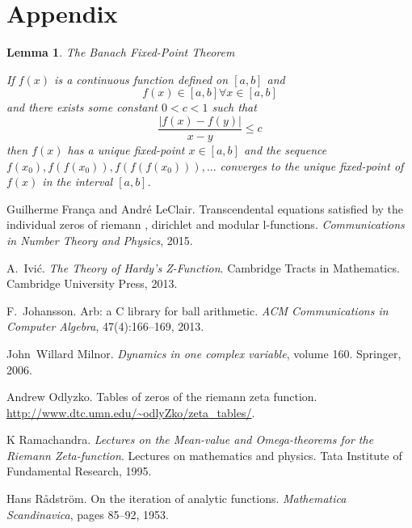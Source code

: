 \documentclass{elsarticle}
\newcommand{\tmtextit}[1]{{\itshape{#1}}}
\newtheorem{lemma}{Lemma}
{\theorembodyfont{\rmfamily}\newtheorem{note}{Note}}
\begin{document}
\section{Appendix}

\begin{lemma}
  The Banach Fixed-Point Theorem
  
  If $f (x)$ is a continuous function defined on $[a, b]$ and
  \begin{equation}
    f (x) \in [a, b] \forall x \in [a, b]
  \end{equation}
  and there exists some constant $0 < c < 1$ such that
  \begin{equation}
    \text{$\frac{| f (x) - f (y) |}{x - y} \leqslant c$} \label{lc}
  \end{equation}
  then $f (x)$ has a unique fixed-point $x \in [a, b]$ and the sequence $f
  (x_0), f (f (x_0)), f (f (f (x_0))), \ldots$ converges to the unique
  fixed-point of $f (x)$ in the interval $[a, b]$.
\end{lemma}

\begin{thebibliography}{1}
  Guilherme Fran{\c c}a  and  Andr{\'e} LeClair.{\newblock}
  Transcendental equations satisfied by the individual zeros of riemann
  {\zeta}, dirichlet and modular l-functions.{\newblock}
  \tmtextit{Communications in Number Theory and Physics}, 2015.{\newblock}
  
  A.~Ivi{\'c}.{\newblock} \tmtextit{The Theory of Hardy's
  Z-Function}.{\newblock} Cambridge Tracts in Mathematics. Cambridge
  University Press, 2013.{\newblock}
  
  F.~Johansson.{\newblock} Arb: a C library for
  ball arithmetic.{\newblock} \tmtextit{ACM Communications in Computer
  Algebra}, 47(4):166--169, 2013.{\newblock}
  
  John~Willard Milnor.{\newblock}
  \tmtextit{Dynamics in one complex variable},  volume  160.{\newblock}
  Springer, 2006.{\newblock}
  
  Andrew Odlyzko.{\newblock} Tables of zeros of the riemann
  zeta function.{\newblock}
  \url{http://www.dtc.umn.edu/~odlyZko/zeta_tables/}.{\newblock}
  
  K Ramachandra.{\newblock}
  \tmtextit{Lectures on the Mean-value and Omega-theorems for the Riemann
  Zeta-function}.{\newblock} Lectures on mathematics and physics. Tata
  Institute of Fundamental Research, 1995.{\newblock}
  
  Hans R{\r a}dstr{\"o}m.{\newblock} On the
  iteration of analytic functions.{\newblock} \tmtextit{Mathematica
  Scandinavica},  pages  85--92, 1953.{\newblock}
\end{thebibliography}
\end{document}
